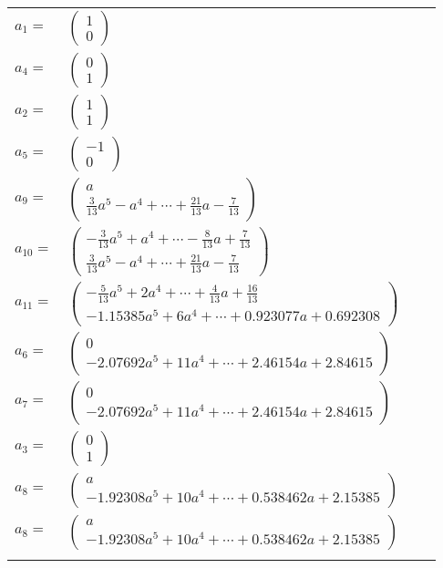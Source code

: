 \documentclass[1p]{elsarticle_modified}
\theoremstyle{definition}
\begin{document}
\begin{tabular}{m{7pt} m{180pt} m{7pt} m{180pt} }
\flushright $a_{1}=$&$\begin{pmatrix}1\\0\end{pmatrix}$ \\
\flushright $a_{4}=$&$\begin{pmatrix}0\\1\end{pmatrix}$ \\
\flushright $a_{2}=$&$\begin{pmatrix}1\\1\end{pmatrix}$ \\
\flushright $a_{5}=$&$\begin{pmatrix}-1\\0\end{pmatrix}$ \\
\flushright $a_{9}=$&$\begin{pmatrix}a\\\frac{3}{13} a^5- a^4+\cdots+\frac{21}{13} a-\frac{7}{13}\end{pmatrix}$ \\
\flushright $a_{10}=$&$\begin{pmatrix}-\frac{3}{13} a^5+a^4+\cdots-\frac{8}{13} a+\frac{7}{13}\\\frac{3}{13} a^5- a^4+\cdots+\frac{21}{13} a-\frac{7}{13}\end{pmatrix}$ \\
\flushright $a_{11}=$&$\begin{pmatrix}-\frac{5}{13} a^5+2 a^4+\cdots+\frac{4}{13} a+\frac{16}{13}\\-1.15385 a^{5}+6 a^{4}+\cdots+0.923077 a+0.692308\end{pmatrix}$ \\
\flushright $a_{6}=$&$\begin{pmatrix}0\\-2.07692 a^{5}+11 a^{4}+\cdots+2.46154 a+2.84615\end{pmatrix}$ \\
\flushright $a_{7}=$&$\begin{pmatrix}0\\-2.07692 a^{5}+11 a^{4}+\cdots+2.46154 a+2.84615\end{pmatrix}$ \\
\flushright $a_{3}=$&$\begin{pmatrix}0\\1\end{pmatrix}$ \\
\flushright $a_{8}=$&$\begin{pmatrix}a\\-1.92308 a^{5}+10 a^{4}+\cdots+0.538462 a+2.15385\end{pmatrix}$\\ \flushright $a_{8}=$&$\begin{pmatrix}a\\-1.92308 a^{5}+10 a^{4}+\cdots+0.538462 a+2.15385\end{pmatrix}$\\&\end{tabular}
\end{document}
